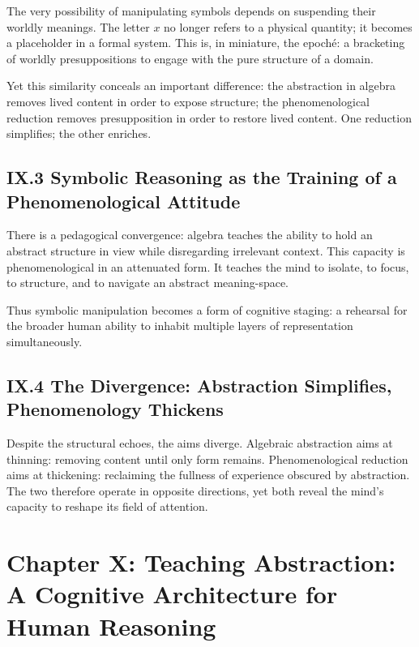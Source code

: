 \documentclass[12pt,letterpaper]{article}
\begin{document}
The very possibility of manipulating symbols depends on suspending their worldly meanings. The letter \(x\) no longer refers to a physical quantity; it becomes a placeholder in a formal system. This is, in miniature, the epoché: a bracketing of worldly presuppositions to engage with the pure structure of a domain.

Yet this similarity conceals an important difference: the abstraction in algebra removes lived content in order to expose structure; the phenomenological reduction removes presupposition in order to restore lived content. One reduction simplifies; the other enriches.

\subsection{IX.3 Symbolic Reasoning as the Training of a Phenomenological Attitude}

There is a pedagogical convergence: algebra teaches the ability to hold an abstract structure in view while disregarding irrelevant context. This capacity is phenomenological in an attenuated form. It teaches the mind to isolate, to focus, to structure, and to navigate an abstract meaning-space.

Thus symbolic manipulation becomes a form of cognitive staging: a rehearsal for the broader human ability to inhabit multiple layers of representation simultaneously.

\subsection{IX.4 The Divergence: Abstraction Simplifies, Phenomenology Thickens}

Despite the structural echoes, the aims diverge. Algebraic abstraction aims at thinning: removing content until only form remains. Phenomenological reduction aims at thickening: reclaiming the fullness of experience obscured by abstraction. The two therefore operate in opposite directions, yet both reveal the mind’s capacity to reshape its field of attention.

\newpage

\section{Chapter X: Teaching Abstraction: A Cognitive Architecture for Human Reasoning}
\end{document}
